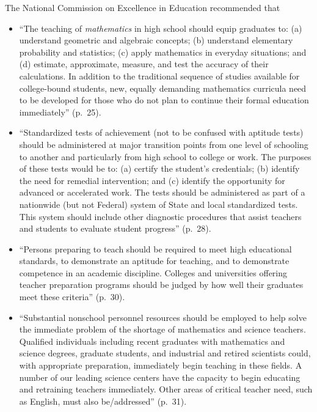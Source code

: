 \documentclass[
]{book}
\theoremstyle{definition}
\theoremstyle{definition}
\theoremstyle{definition}
\theoremstyle{remark}
\begin{document}
The National Commission on Excellence in Education \citeyearpar{NCEE1983} recommended that

\begin{itemize}
\item
  ``The teaching of \emph{mathematics} in high school should equip graduates to: (a) understand geometric and algebraic concepts; (b) understand elementary probability and statistics; (c) apply mathematics in everyday situations; and (d) estimate, approximate, measure, and test the accuracy of their calculations. In addition to the traditional sequence of studies available for college-bound students, new, equally demanding mathematics curricula need to be developed for those who do not plan to continue their formal education immediately'' (p.~25).
\item
  ``Standardized tests of achievement (not to be confused with aptitude tests) should be administered at major transition points from one level of schooling to another and particularly from high school to college or work. The purposes of these tests would be to: (a) certify the student's credentials; (b) identify the need for remedial intervention; and (c) identify the opportunity for advanced or accelerated work. The tests should be administered as part of a nationwide (but not Federal) system of State and local standardized tests. This system should include other diagnostic procedures that assist teachers and students to evaluate student progress'' (p.~28).
\item
  ``Persons preparing to teach should be required to meet high educational standards, to demonstrate an aptitude for teaching, and to demonstrate competence in an academic discipline. Colleges and universities offering teacher preparation programs should be judged by how well their graduates meet these criteria'' (p.~30).
\item
  ``Substantial nonschool personnel resources should be employed to help solve the immediate problem of the shortage of mathematics and science teachers. Qualified individuals including recent graduates with mathematics and science degrees, graduate students, and industrial and retired scientists could, with appropriate preparation, immediately begin teaching in these fields. A number of our leading science centers have the capacity to begin educating and retraining teachers immediately. Other areas of critical teacher need, such as English, must also be/addressed'' (p.~31).
\end{itemize}
\end{document}
